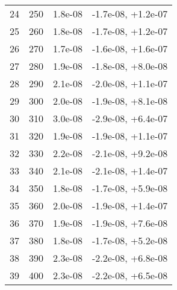 \begin{table}
\begin{adjustbox}{width=1\textwidth/2}
\begin{tabular}{|c|c|c|c|}
\cline{1-4}
24 & 250 & 1.8e-08 & -1.7e-08, +1.2e-07 \\
\cline{1-4}
25 & 260 & 1.8e-08 & -1.7e-08, +1.2e-07 \\
\cline{1-4}
26 & 270 & 1.7e-08 & -1.6e-08, +1.6e-07 \\
\cline{1-4}
27 & 280 & 1.9e-08 & -1.8e-08, +8.0e-08 \\
\cline{1-4}
28 & 290 & 2.1e-08 & -2.0e-08, +1.1e-07 \\
\cline{1-4}
29 & 300 & 2.0e-08 & -1.9e-08, +8.1e-08 \\
\cline{1-4}
30 & 310 & 3.0e-08 & -2.9e-08, +6.4e-07 \\
\cline{1-4}
31 & 320 & 1.9e-08 & -1.9e-08, +1.1e-07 \\
\cline{1-4}
32 & 330 & 2.2e-08 & -2.1e-08, +9.2e-08 \\
\cline{1-4}
33 & 340 & 2.1e-08 & -2.1e-08, +1.4e-07 \\
\cline{1-4}
34 & 350 & 1.8e-08 & -1.7e-08, +5.9e-08 \\
\cline{1-4}
35 & 360 & 2.0e-08 & -1.9e-08, +1.4e-07 \\
\cline{1-4}
36 & 370 & 1.9e-08 & -1.9e-08, +7.6e-08 \\
\cline{1-4}
37 & 380 & 1.8e-08 & -1.7e-08, +5.2e-08 \\
\cline{1-4}
38 & 390 & 2.3e-08 & -2.2e-08, +6.8e-08 \\
\cline{1-4}
39 & 400 & 2.3e-08 & -2.2e-08, +6.5e-08 \\
\cline{1-4}
\end{tabular}
\end{adjustbox}
\end{table}

